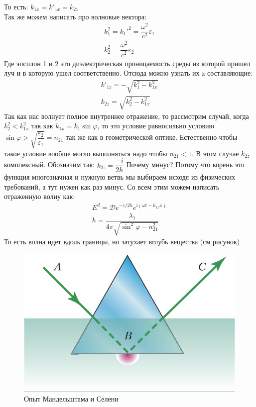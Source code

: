 \documentclass[a4paper, 12pt]{article}
\renewcommand{\phi}{\varphi} %
\begin{document}
	То есть: $k_{1x} = k'_{1x} = k_{2x}$\\
	Так же можем написать про волновые вектора:
	\begin{align*}
	k_1^2 = k_1'^2 = \dfrac{\omega^2 }{c^2 } \varepsilon_1\\
	k_2^2 = \dfrac{\omega^2 }{c^2 } \varepsilon_2
	\end{align*}
	Где эпсилон 1 и 2 это диэлектрическая проницаемость среды из которой пришел луч и в которую ушел соответственно. Отсюда можно узнать их z составляющие:
	\begin{align*}
	k'_{1z} = - \sqrt{k_1^2 - k_{1x}^2}\\
	k_{2z} = \sqrt{k_2^2 - k_{1x}^2}	
	\end{align*}
	Так как нас волнует полное внутреннее отражение, то рассмотрим случай, когда $k_2^2 < k_{1x}^2 $ так как $k_{1x} = k_1 \sin \phi$, то это условие равносильно условию $\sin \phi > \sqrt{\dfrac{\varepsilon_2}{\varepsilon_1}} = n_{21}$ так же как в геометрической оптике. Естественно чтобы такое условие вообще могло выполняться надо чтобы $n_{21}<1$. В этом случае $k_{2z}$ комплексный. Обозначим так: $k_{2z} = \dfrac{-i}{2h}$ Почему минус? Потому что корень это функция многозначная и нужную ветвь мы выбираем исходя из физических требований, а тут нужен как раз минус. Со всем этим можем написать отраженную волну как:
	\begin{align*}
	E^{d} = \mathcal{D}e^{-z/2h} e^{i(\omega t - k_{1x} x)}\\
	h = \dfrac{\lambda_1}{4\pi \sqrt{\sin^2 \phi  - n_{21}^2}}
	\end{align*}
	То есть волна идет вдоль границы, но затухает вглубь вещества (см рисунок)
	\begin{figure}[H]
		\centering
		\caption{Опыт Мандельштама и Селени}
		\includegraphics[scale = 1]{2_2}
	
	\end{figure}
\end{document}
